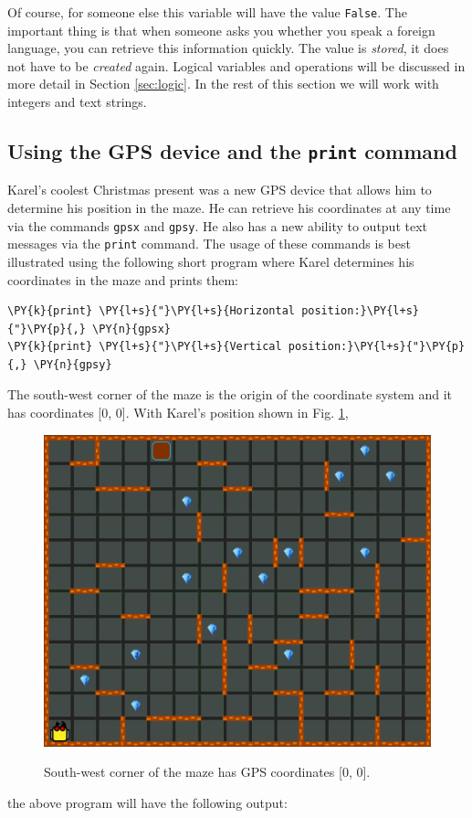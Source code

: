 \noindent
Of course, for someone else this variable will have the value {\tt False}. The important 
thing is that when someone asks you whether you speak a foreign language, you can retrieve 
this information quickly. The value is {\em stored}, it does not have to be {\em created}
again. Logical variables and operations will be discussed in more detail in Section 
\ref{sec:logic}. In the rest of this section we will work with integers and text strings.

\subsection[\ \ Using the GPS device and the {\tt print} command]{Using the GPS device and the {\tt print} command}

Karel's coolest Christmas present was a new GPS device that allows him to determine his position 
in the maze. He can retrieve his coordinates at any time via the 
commands {\tt gpsx} and {\tt gpsy}. He also has a new ability to output text messages via the {\tt print} 
command. The usage of these commands is best illustrated using the following short program where 
Karel determines his coordinates in the maze and prints them:\\

\begin{bbox}
\begin{Verbatim}[commandchars=\\\{\}]
\PY{k}{print} \PY{l+s}{"}\PY{l+s}{Horizontal position:}\PY{l+s}{"}\PY{p}{,} \PY{n}{gpsx}
\PY{k}{print} \PY{l+s}{"}\PY{l+s}{Vertical position:}\PY{l+s}{"}\PY{p}{,} \PY{n}{gpsy}
\end{Verbatim}
\end{bbox}
\vspace{6mm}

\noindent
The south-west corner of the maze is the origin of the coordinate system and it has 
coordinates [0, 0]. With Karel's position shown in Fig. \ref{fig:gps-100},
\newpage
\begin{figure}[!ht]
\begin{center}
\includegraphics[height=0.4\textwidth]{img/gps-100.png}
\vspace{-0mm}
\caption{South-west corner of the maze has GPS coordinates [0, 0].}
\vspace{-6mm}
\label{fig:gps-100}
\end{center}
\end{figure}
\noindent
the above program will have the following output:\\

